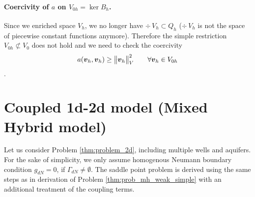 \paragraph{Coercivity of $a$ on $V_{0h}=\ker B_h$.}
Since we enriched space $V_h$, we no longer have $\div\,V_{h}\subset Q_h$
($\div\,V_{h}$ is not the space of piecewise constant functions anymore).
Therefore the simple restriction $V_{0h}\not\subset V_0$ does not hold and 
we need to check the coercivity
\[a(\mathbf{\boldsymbol{v}}_h,\mathbf{\boldsymbol{v}}_h)\geq \bigl\Vert\mathbf{\boldsymbol{v}}_h\bigr\Vert^2_V  \qquad \forall \mathbf{\boldsymbol{v}}_h\in V_{0h}\].


\section{Coupled 1d-2d model (Mixed Hybrid model)}
\label{sec:coupled_12d}
Let us consider Problem \ref{thm:problem_2d}, including multiple wells and aquifers.
For the sake of simplicity, we only assume homogenous Neumann boundary condition $g_{dN}=0$, if $\Gamma_{dN}\neq\emptyset$.
The saddle point problem is derived using the same steps
as in derivation of Problem \ref{thm:prob_mh_weak_simple} with an additional treatment of the coupling terms.

